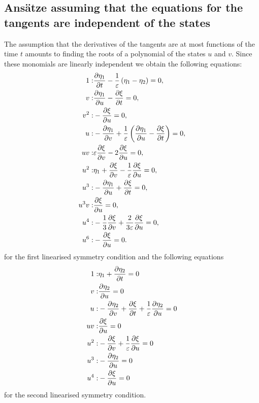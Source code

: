 \subsection{Ans\"atze assuming that the equations for the tangents are independent of the states}
The assumption that the derivatives of the tangents are at most functions of the time $t$ amounts to finding the roots of a polynomial of the states $u$ and $v$. Since these monomials are linearly independent we obtain the following equations:
\begin{align}
  1:&\pdv{\eta_1}{t} - \frac{1}{\varepsilon}\left(\eta_1 - \eta_2\right)=0,\\
  v:&\pdv{\eta_1}{u} - \pdv{\xi}{t}=0,\\
  v^{2}:&- \pdv{\xi}{u}=0,\\
  u:&-\pdv{\eta_1}{v} + \frac{1}{\varepsilon}\left(\pdv{\eta_1}{u}  - \pdv{\xi}{t}\right)=0,\\  
  u v:&\varepsilon\pdv{\xi}{v} - 2 \pdv{\xi}{u}=0,\\
  u^{2}:&\eta_1 + \pdv{\xi}{v} - \frac{1}{\varepsilon} \pdv{\xi}{u}=0,\\
  u^{3}:&- \pdv{\eta_1}{u} + \pdv{\xi}{t}=0,\\
u^{3} v:&\pdv{\xi}{u}=0,\\
 u^{4}:&- \frac{1}{3}\pdv{\xi}{v} + \frac{2}{3 \varepsilon}\pdv{\xi}{u}=0,\\
 u^{6}:&- \pdv{\xi}{u}=0.
\end{align}
for the first linearised symmetry condition and the following equations
\begin{align}
1:&\eta_1 + \pdv{\eta_2}{t}=0\\
v:&\pdv{\eta_2}{u}=0\\
u:&- \pdv{\eta_2}{v}  + \pdv{\xi}{t} + \frac{1}{\varepsilon}\pdv{\eta_2}{u} =0\\
u v:&\pdv{\xi}{u}=0\\
u^{2}:&- \pdv{\xi}{v} + \frac{1}{\varepsilon}\pdv{\xi}{u} =0\\
u^{3}:&- \pdv{\eta_2}{u}=0\\
u^{4}:&- \pdv{\xi}{u}=0
\end{align}
for the second linearised symmetry condition. 